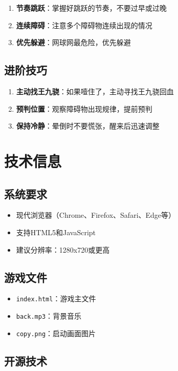 \documentclass[12pt,a4paper]{article}
\begin{document}
\begin{enumerate}
  \item \textbf{节奏跳跃}：掌握好跳跃的节奏，不要过早或过晚
  \item \textbf{连续障碍}：注意多个障碍物连续出现的情况
  \item \textbf{优先躲避}：网球网最危险，优先躲避
\end{enumerate}

\subsection{进阶技巧}

\begin{enumerate}
  \item \textbf{主动找王九骁}：如果噎住了，主动寻找王九骁回血
  \item \textbf{预判位置}：观察障碍物出现规律，提前预判
  \item \textbf{保持冷静}：晕倒时不要慌张，醒来后迅速调整
\end{enumerate}

\section{技术信息}

\subsection{系统要求}

\begin{itemize}
  \item 现代浏览器（Chrome、Firefox、Safari、Edge等）
  \item 支持HTML5和JavaScript
  \item 建议分辨率：1280x720或更高
\end{itemize}

\subsection{游戏文件}

\begin{itemize}
  \item \texttt{index.html}：游戏主文件
  \item \texttt{back.mp3}：背景音乐
  \item \texttt{copy.png}：启动画面图片
\end{itemize}

\subsection{开源技术}
\end{document}
